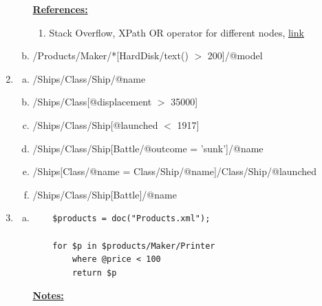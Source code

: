 \documentclass[12pt]{article}
\begin{document}
\begin{enumerate}[1.]
\begin{enumerate}[a)]
        \bigskip

        \underline{\textbf{References:}}

        \bigskip

        \begin{enumerate}[1)]
            \item Stack Overflow, XPath OR operator for different nodes, \href{https://stackoverflow.com/questions/5350666/xpath-or-operator-for-different-nodes}{link}
        \end{enumerate}

        \item /Products/Maker/*[HardDisk/text() $>$ 200]/@model
    \end{enumerate}

    \item

    \begin{enumerate}[a)]
        \item /Ships/Class/Ship/@name
        \item /Ships/Class[@displacement $>$ 35000]
        \item /Ships/Class/Ship[@launched $<$ 1917]
        \item /Ships/Class/Ship[Battle/@outcome = 'sunk']/@name
        \item /Ships[Class/@name = Class/Ship/@name]/Class/Ship/@launched
        \item /Ships/Class/Ship[Battle]/@name
    \end{enumerate}

    \item

    \begin{enumerate}[a)]
        \item

    \begin{lstlisting}
    $products = doc("Products.xml");

    for $p in $products/Maker/Printer
        where @price < 100
        return $p
    \end{lstlisting}

        \bigskip

        \underline{\textbf{Notes:}}

        \bigskip


\end{enumerate}
\end{enumerate}
\end{document}
